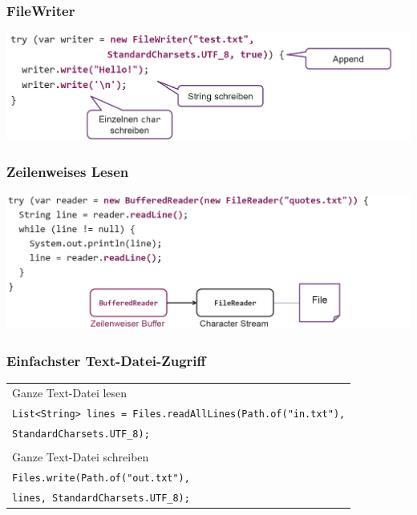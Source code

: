 \subsubsection{FileWriter}
\includegraphics[width=0.9\linewidth]{pictures/filewriter.jpg}

\subsubsection{Zeilenweises Lesen}
\includegraphics[width=0.9\linewidth]{pictures/zeilenweise.jpg}

\subsubsection{Einfachster Text-Datei-Zugriff}
\begin{tabular}{l}
    Ganze Text-Datei lesen \\
    \verb|List<String> lines = Files|\verb|.readAllLines(Path.of("in.txt"),| \\
    \verb|StandardCharsets.UTF_8);| \\
    \\
    Ganze Text-Datei schreiben \\
    \verb|Files.write(Path.of("out.txt"),| \\
    \verb|lines, StandardCharsets.UTF_8);| \\
\end{tabular}